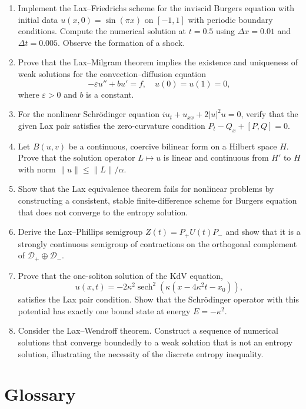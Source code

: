 \begin{enumerate}
\[    \]
    for all \(u\) between \(u_L\) and \(u_R\).
    \item [B] Implement the Lax--Friedrichs scheme for the inviscid Burgers equation with initial data \(u(x,0) = \sin(\pi x)\) on \([-1,1]\) with periodic boundary conditions. Compute the numerical solution at \(t = 0.5\) using \(\Delta x = 0.01\) and \(\Delta t = 0.005\). Observe the formation of a shock.
    \item [I] Prove that the Lax--Milgram theorem implies the existence and uniqueness of weak solutions for the convection--diffusion equation
    \[
    -\varepsilon u'' + b u' = f, \quad u(0) = u(1) = 0,
    \]
    where \(\varepsilon > 0\) and \(b\) is a constant.
    \item [A] For the nonlinear Schr\"odinger equation \(i u_t + u_{xx} + 2|u|^2 u = 0\), verify that the given Lax pair satisfies the zero-curvature condition \(P_t - Q_x + [P,Q] = 0\).
    \item [B] Let \(B(u,v)\) be a continuous, coercive bilinear form on a Hilbert space \(H\). Prove that the solution operator \(L \mapsto u\) is linear and continuous from \(H'\) to \(H\) with norm \(\|u\| \leq \|L\|/\alpha\).
    \item [I] Show that the Lax equivalence theorem fails for nonlinear problems by constructing a consistent, stable finite-difference scheme for Burgers equation that does not converge to the entropy solution.
    \item [A] Derive the Lax--Phillips semigroup \(Z(t) = P_+ U(t) P_-\) and show that it is a strongly continuous semigroup of contractions on the orthogonal complement of \(\mathcal{D}_+ \oplus \mathcal{D}_-\).
    \item [I] Prove that the one-soliton solution of the KdV equation,
    \[
    u(x,t) = -2\kappa^2 \operatorname{sech}^2(\kappa(x - 4\kappa^2 t - x_0)),
    \]
    satisfies the Lax pair condition. Show that the Schr\"odinger operator with this potential has exactly one bound state at energy \(E = -\kappa^2\).
    \item [A] Consider the Lax--Wendroff theorem. Construct a sequence of numerical solutions that converge boundedly to a weak solution that is not an entropy solution, illustrating the necessity of the discrete entropy inequality.
\end{enumerate}

\section*{Glossary}

